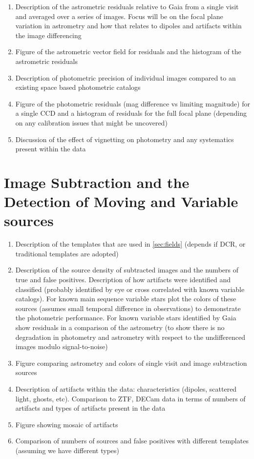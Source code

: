 \begin{enumerate}

    \item Description of the astrometric residuals relative to Gaia from a single visit and averaged over a series of images. Focus will be 
    on the focal plane variation in astrometry and how that relates to dipoles and artifacts within the image differencing
    \item Figure of the astrometric vector field for residuals and the histogram of the astrometric residuals
    \item Description of photometric precision of individual images compared to an existing space based photometric catalogs
    \item Figure of the photometric residuals (mag difference vs limiting magnitude) for a single CCD and a histogram of residuals for the full focal plane
     (depending on any calibration issues that might be uncovered)
     \item Discussion of the effect of vignetting on photometry and any systematics present within the data

\end{enumerate}

\section{Image Subtraction and the Detection of Moving and Variable sources}

\begin{enumerate}

    \item Description of the templates that are used in \ref{sec:fields} (depends if DCR, or traditional templates are adopted)
    \item Description of the source density of subtracted images and the numbers of true and false positives. Description of how 
    artifacts were identified and classified (probably identified by eye or cross correlated with known variable catalogs). 
    For known main sequence variable stars plot the colors of these sources (assumes small temporal difference in observations)
    to demonstrate the photometric performance. For known variable stars identified by Gaia show residuals in a comparison of the astrometry (to
    show there is no degradation in photometry and astrometry with respect to the undifferenced images modulo signal-to-noise)
    \item Figure comparing astrometry and colors of single visit and image subtraction sources 
    \item Description of artifacts within the data: characteristics (dipoles, scattered light, ghosts, etc). Comparison to ZTF, DECam data in terms
    of numbers of artifacts and types of artifacts present in the data
    \item Figure showing mosaic of artifacts
    \item Comparison of numbers of sources and false positives with different templates (assuming we have different types)

\end{enumerate}



